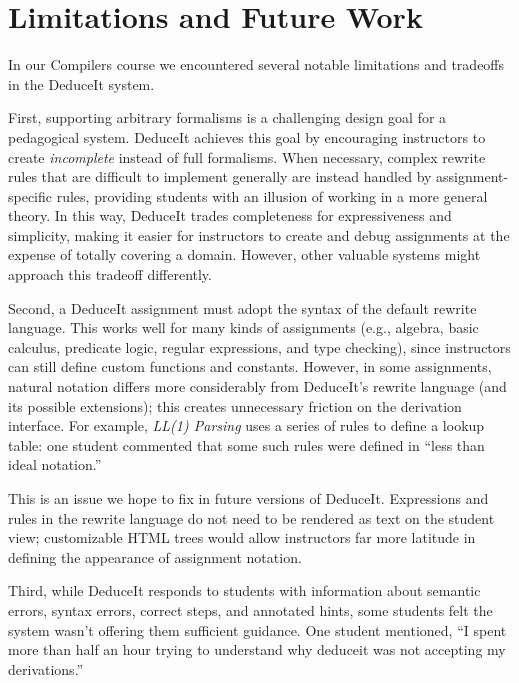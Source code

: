 \documentclass{sigchi}
\begin{document}
\section{Limitations and Future Work}

In our Compilers course we encountered several notable limitations and tradeoffs in the DeduceIt system.

First, supporting arbitrary formalisms is a challenging design goal for a pedagogical system. DeduceIt achieves this goal by encouraging instructors to create \textit{incomplete} instead of full formalisms. When necessary, complex rewrite rules that are difficult to implement generally are instead handled by assignment-specific rules, providing students with an illusion of working in a more general theory. In this way, DeduceIt trades completeness for expressiveness and simplicity, making it easier for instructors to create and debug assignments at the expense of totally covering a domain. However, other valuable systems might approach this tradeoff differently.

Second, a DeduceIt assignment must adopt the syntax of the default rewrite language. This works well for many kinds of assignments (e.g., algebra, basic calculus, predicate logic, regular expressions, and type checking), since instructors can still define custom functions and constants. However, in some assignments, natural notation differs more considerably from DeduceIt's rewrite language (and its possible extensions); this creates unnecessary friction on the derivation interface. For example, \textit{LL(1) Parsing} uses a series of rules to define a lookup table: one student commented that some such rules were defined in ``less than ideal notation.'' %

This is an issue we hope to fix in future versions of DeduceIt. Expressions and rules in the rewrite language do not need to be rendered as text on the student view; customizable HTML trees would allow instructors far more latitude in defining the appearance of assignment notation.

Third, while DeduceIt responds to students with information about semantic errors, syntax errors, correct steps, and annotated hints, some students felt the system wasn't offering them sufficient guidance. One student mentioned, ``I spent more than half an hour trying to understand why deduceit was not accepting my derivations.''
\end{document}
